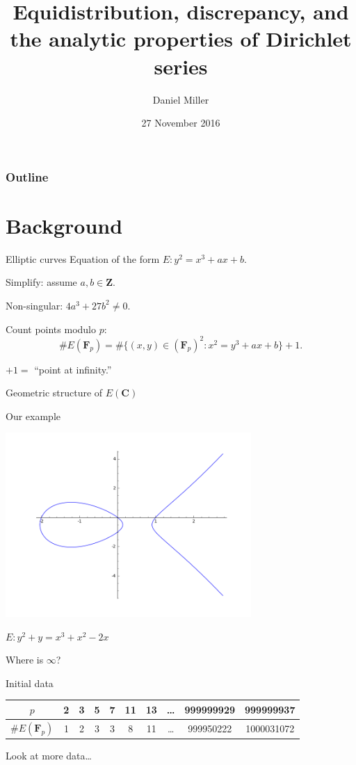 \documentclass{beamer}
\title{Equidistribution, discrepancy, and the analytic properties of Dirichlet series}
\author{Daniel Miller}
\institute{Cornell University}
\date{27 November 2016}
\newcommand{\bC}{\mathbf{C}}
\newcommand{\bF}{\mathbf{F}}
\newcommand{\bZ}{\mathbf{Z}}
\begin{document}
\begin{frame}
\titlepage
\end{frame}

\begin{frame}
\frametitle{Outline}
\tableofcontents
\end{frame}

\section{Background}

\begin{frame}{Elliptic curves}
Equation of the form $E:y^2=x^3+ax+b$.
\pause

Simplify: assume $a,b\in \bZ$.
\pause

Non-singular: $4a^3+27b^2\ne 0$. 
\pause

Count points modulo $p$: 
\[
	\# E(\bF_p) = \#\{(x,y)\in (\bF_p)^2 : x^2=y^3+ax+b\} + 1 .
\]
\pause

$+1=$ ``point at infinity.''
\pause

Geometric structure of $E(\bC)$
\end{frame}

\begin{frame}{Our example}
\begin{center}
\includegraphics[width=0.7\textwidth]{rank2_contour}

$E:y^2+y = x^3+x^2-2x$
\end{center}
\pause

Where is $\infty$?
\end{frame}

\begin{frame}{Initial data}
\begin{tabular}{c|ccccccccc}
$p$ & 2 & 3 & 5 & 7 & 11 & 13 & \ldots & 999999929 & 999999937 \\ \hline
$\# E(\bF_p)$ & 1 & 2 & 3 & 3 & 8 & 11 & \ldots & 999950222 & 1000031072
\end{tabular}

\pause
Look at more data\ldots
\end{frame}
\end{document}
